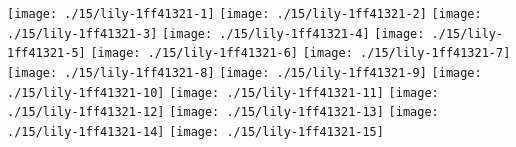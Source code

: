 \texttt{[image: ./15/lily-1ff41321-1]}%
\ifx\betweenLilyPondSystem \undefined
  \linebreak
\else
  \expandafter{}%
\fi
\texttt{[image: ./15/lily-1ff41321-2]}%
\ifx\betweenLilyPondSystem \undefined
  \linebreak
\else
  \expandafter{}%
\fi
\texttt{[image: ./15/lily-1ff41321-3]}%
\ifx\betweenLilyPondSystem \undefined
  \linebreak
\else
  \expandafter{}%
\fi
\texttt{[image: ./15/lily-1ff41321-4]}%
\ifx\betweenLilyPondSystem \undefined
  \linebreak
\else
  \expandafter{}%
\fi
\texttt{[image: ./15/lily-1ff41321-5]}%
\ifx\betweenLilyPondSystem \undefined
  \linebreak
\else
  \expandafter{}%
\fi
\texttt{[image: ./15/lily-1ff41321-6]}%
\ifx\betweenLilyPondSystem \undefined
  \linebreak
\else
  \expandafter{}%
\fi
\texttt{[image: ./15/lily-1ff41321-7]}%
\ifx\betweenLilyPondSystem \undefined
  \linebreak
\else
  \expandafter{}%
\fi
\texttt{[image: ./15/lily-1ff41321-8]}%
\ifx\betweenLilyPondSystem \undefined
  \linebreak
\else
  \expandafter{}%
\fi
\texttt{[image: ./15/lily-1ff41321-9]}%
\ifx\betweenLilyPondSystem \undefined
  \linebreak
\else
  \expandafter{}%
\fi
\texttt{[image: ./15/lily-1ff41321-10]}%
\ifx\betweenLilyPondSystem \undefined
  \linebreak
\else
  \expandafter{}%
\fi
\texttt{[image: ./15/lily-1ff41321-11]}%
\ifx\betweenLilyPondSystem \undefined
  \linebreak
\else
  \expandafter{}%
\fi
\texttt{[image: ./15/lily-1ff41321-12]}%
\ifx\betweenLilyPondSystem \undefined
  \linebreak
\else
  \expandafter{}%
\fi
\texttt{[image: ./15/lily-1ff41321-13]}%
\ifx\betweenLilyPondSystem \undefined
  \linebreak
\else
  \expandafter{}%
\fi
\texttt{[image: ./15/lily-1ff41321-14]}%
\ifx\betweenLilyPondSystem \undefined
  \linebreak
\else
  \expandafter{}%
\fi
\texttt{[image: ./15/lily-1ff41321-15]}%
\ifx\betweenLilyPondSystem \undefined
